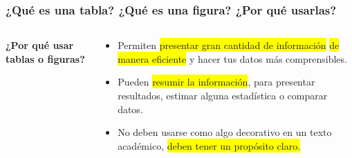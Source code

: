 \documentclass[
11pt, %
]{beamer}
\begin{document}
\begin{frame}
	\frametitle{¿Qué es una tabla? ¿Qué es una figura? ¿Por qué usarlas?}

	\begin{columns}[c] %
		\begin{column}{0.2\textwidth} %
			\textbf{¿Por qué usar tablas o figuras?}
		\end{column}
		\begin{column}{0.5\textwidth} %
			\begin{itemize}
				\item Permiten \colorbox{yellow}{presentar gran cantidad de información}
				      \colorbox{yellow}{de manera eficiente} y hacer tus datos más comprensibles.
				\item Pueden \colorbox{yellow}{resumir la información}, para presentar resultados,
				      estimar alguna estadística o comparar datos.
				\item No deben usarse como algo decorativo en un texto académico,
				      \colorbox{yellow}{deben tener un propósito claro.}
			\end{itemize}
		\end{column}
	\end{columns}

\end{frame}
\end{document}
